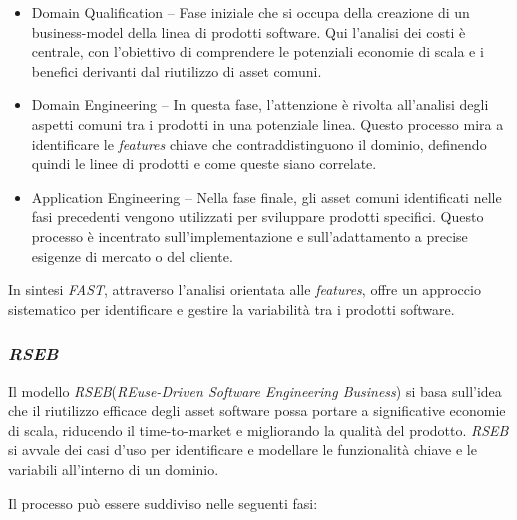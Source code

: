 \documentclass[12pt]{report}
\newcommand{\fast}{\textsl{FAST}\xspace}
\newcommand{\rseb}{\textsl{RSEB}\xspace}
\begin{document}
\begin{itemize}
\item \textsf{Domain Qualification} -- Fase iniziale che si occupa della creazione di un business-model della linea di prodotti software. Qui l'analisi dei costi è centrale, con l'obiettivo di comprendere le potenziali economie di scala e i benefici derivanti dal riutilizzo di asset comuni.
\item \textsf{Domain Engineering} -- In questa fase, l'attenzione è rivolta all'analisi degli aspetti comuni tra i prodotti in una potenziale linea. Questo processo mira a identificare le \textit{features} chiave che contraddistinguono il dominio, definendo quindi le linee di prodotti e come queste siano correlate.
\item \textsf{Application Engineering} -- Nella fase finale, gli asset comuni identificati nelle fasi precedenti vengono utilizzati per sviluppare prodotti specifici. Questo processo è incentrato sull'implementazione e sull'adattamento a precise esigenze di mercato o del cliente.
\end{itemize}

In sintesi \fast, attraverso l'analisi orientata alle \textit{features}, offre un approccio sistematico per identificare e gestire la variabilità tra i prodotti software.


\subsubsection{\rseb}
Il modello \rseb (\textit{REuse-Driven Software Engineering Business}) \cite{griss:favaro:alessandro} si basa sull'idea che il riutilizzo efficace degli asset software possa portare a significative economie di scala, riducendo il time-to-market e migliorando la qualità del prodotto. \rseb si avvale dei casi d'uso per identificare e modellare le funzionalità chiave e le variabili all'interno di un dominio.

Il processo può essere suddiviso nelle seguenti fasi:
\end{document}
